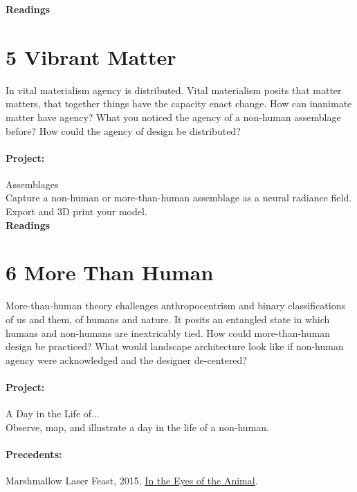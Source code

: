 \documentclass[11pt,article,oneside]{memoir}
\begin{document}
\noindent
\textbf{Readings}
\nocite{*}
\setlength{}
\printbibliography[keyword=xenofeminism, heading=none]

\section{5 Vibrant Matter}

In vital materialism agency is distributed. 
Vital materialism 
posits that matter matters,
that together things 
have the capacity enact change.
How can inanimate matter have agency? 
What you noticed the agency of a non-human assemblage before?
How could the agency of design be distributed? 

\paragraph{Project:} Assemblages \\

\noindent
Capture a non-human or more-than-human assemblage 
as a neural radiance field. 
Export and 3D print your model. 
\\

\noindent
\textbf{Readings}
\nocite{*}
\setlength{}
\printbibliography[keyword=vibrant-matter, heading=none]

\section{6 More Than Human}  

More-than-human theory
challenges anthropocentrism and
binary classifications
of us and them,
of humans and nature.
It posits an entangled state
in which humans and non-humans
are inextricably tied.
How could more-than-human design be practiced?
What would landscape architecture look like 
if non-human agency were acknowledged
and the designer de-centered? 

\paragraph{Project:} A Day in the Life of... \\

\noindent
Observe, map, and illustrate a day in the life of a non-human.

\paragraph{Precedents:} 
Marshmallow Laser Feast, 2015, \href{http://intheeyesoftheanimal.com/}{In the Eyes of the Animal}.
\\
\end{document}
